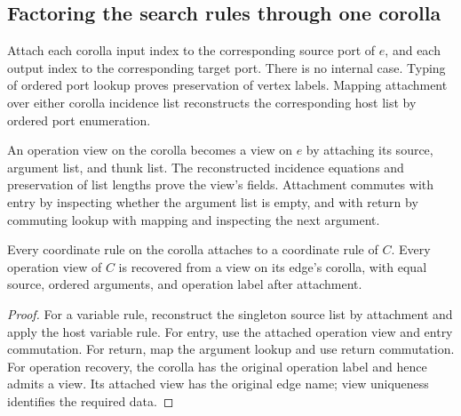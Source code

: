 \subsection{Factoring the search rules through one corolla}
\begin{definition}\label{term:corolla-attachment}
Attach each corolla input index to the corresponding source port of $e$, and
each output index to the corresponding target port. There is no internal case.
Typing of ordered port lookup proves preservation of vertex labels. Mapping
attachment over either corolla incidence list reconstructs the corresponding
host list by ordered port enumeration.
\end{definition}
An operation view on the corolla becomes a view on $e$ by attaching its source,
argument list, and thunk list. The reconstructed incidence equations and
preservation of list lengths prove the view's fields. Attachment commutes
with entry by inspecting whether the argument list is empty, and with return
by commuting lookup with mapping and inspecting the next argument.
\begin{lemma}
Every coordinate rule on the corolla attaches to a coordinate rule of $C$.
Every operation view of $C$ is recovered from a view on its edge's corolla,
with equal source, ordered arguments, and operation label after attachment.
\end{lemma}
\begin{proof}
For a variable rule, reconstruct the singleton source list by attachment and
apply the host variable rule. For entry, use the attached operation view and
entry commutation. For return, map the argument lookup and use return
commutation. For operation recovery, the corolla has the original operation
label and hence admits a view. Its attached view has the original edge name;
view uniqueness identifies the required data.
\end{proof}
